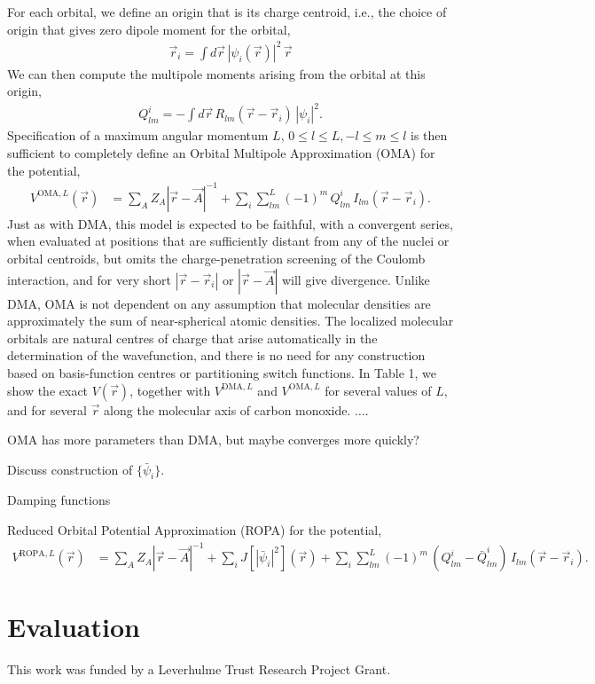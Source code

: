 \documentclass[journal=jacsat,manuscript=article]{achemso}
\begin{document}
For each orbital, we define an origin that is its charge centroid, i.e., the
choice of origin that gives zero dipole moment for the orbital,
\begin{align}
  \vec r_i = \int d \vec r \,|\psi_i(\vec r)|^2 \,  \vec r
\end{align}
We can then compute the multipole moments arising from the orbital at this origin,
\begin{align}
    Q^i_{lm} = -\int d\vec r \, R_{lm}(\vec r-\vec r_i) \, |\psi_i|^2
    .
\end{align}
Specification of a maximum angular momentum $L$, $0\le l\le L, -l\le m\le l$ is then sufficient to completely define an Orbital Multipole Approximation (OMA) for the potential,
\begin{align}
    V^{\text{OMA},L}(\vec r) &=
    \sum_A Z_A |\vec r
    - \vec A|^{-1}
    +\sum_i \sum_{lm}^L(-1)^m\, Q^i_{lm}\, I_{lm}(\vec r - \vec r_i)
    .
\end{align}
Just as with DMA, this model is expected to be faithful, with a convergent series, when evaluated at positions that are sufficiently distant from any of the nuclei or orbital centroids, but omits the
charge-penetration screening of the Coulomb interaction, and for very short $|\vec r-\vec r_i|$ or $|\vec r-\vec A|$ will give divergence. Unlike DMA, OMA is not dependent on any assumption that molecular densities are approximately the sum of near-spherical atomic densities. The localized molecular orbitals are natural centres of charge that arise automatically in the determination of the wavefunction, and there is no need for any construction based
on basis-function centres\cite{Stone1981} or partitioning switch functions\cite{Stone2005DistributedSets.}.
In Table 1, we show the exact $V(\vec r)$, together with
$V^{\text{DMA},L}$ and
$V^{\text{OMA},L}$ for several values of $L$, and for several $\vec r$ along the molecular axis of carbon monoxide. $\dots$.

OMA has more parameters than DMA, but maybe converges more quickly?

Discuss construction of $\{\bar\psi_i\}$.

Damping functions\cite{Koide1981a,Tang1984AnCoefficients,Knowles1986,Knowles1986a,Knowles1987a}

Reduced Orbital Potential Approximation (ROPA) for the potential,
\begin{align}
    V^{\text{ROPA},L}(\vec r) &=
    \sum_A Z_A |\vec r
    - \vec A|^{-1}
    +\sum_i J\left[\left|\bar\psi_i\right|^2\right](\vec r)
    +\sum_i \sum_{lm}^L (-1)^m\,\left(Q^i_{lm}-\bar Q^i_{lm}\right)\, I_{lm}(\vec r - \vec r_i)
    .
\end{align}
\section{Evaluation}

\begin{acknowledgement}

This work was funded by a Leverhulme Trust Research Project Grant.

\end{acknowledgement}

\begin{suppinfo}


\end{suppinfo}


\end{document}

